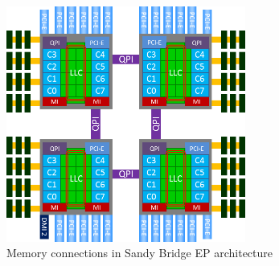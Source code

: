 \documentclass[12pt, a4paper]{report}
\begin{document}
\begin{figure}[H]
  \begin{center}
    \includegraphics[width=0.7\textwidth,natwidth=593,natheight=585]{images/SandyBridgeEP4c.png}
    \caption{Memory connections in Sandy Bridge EP architecture}
    \label{fig:sandy-bridge-ep-arch}
  \end{center}
\end{figure}
\end{document}
